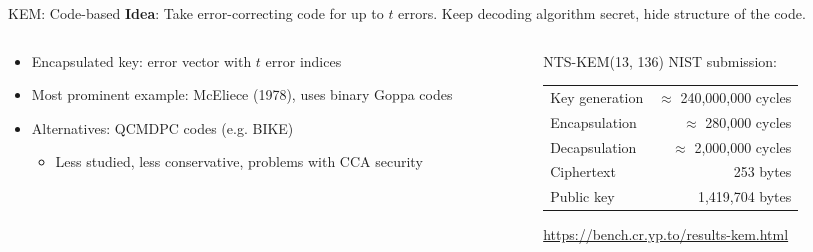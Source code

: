 \documentclass[xcolor=table,10pt,aspectratio=169]{beamer}
\begin{document}
\begin{frame}[label={sec:org111995a}]{KEM: Code-based}
\textbf{Idea}: Take error-correcting code for up to \(t\) errors. Keep decoding algorithm secret, hide structure of the code.

\begin{columns}[t]
\begin{column}{0.5\columnwidth}
\begin{itemize}
\item Encapsulated key: error vector with \(t\) error indices
\item Most prominent example: McEliece (1978), uses binary Goppa codes
\item Alternatives: QCMDPC codes (e.g. BIKE)
\begin{itemize}
\item Less studied, less conservative, problems with CCA security
\end{itemize}
\end{itemize}
\end{column}

\begin{column}{0.5\columnwidth}
NTS-KEM(13, 136) NIST submission:

\begin{center}
\begin{tabular}{lr}
Key generation & \(\approx\) 240,000,000 cycles\\
Encapsulation & \(\approx\) 280,000 cycles\\
Decapsulation & \(\approx\) 2,000,000 cycles\\
Ciphertext & 253 bytes\\
Public key & 1,419,704 bytes\\
\end{tabular}

\end{center}

\small \url{https://bench.cr.yp.to/results-kem.html}
\end{column}
\end{columns}
\end{frame}
\end{document}
